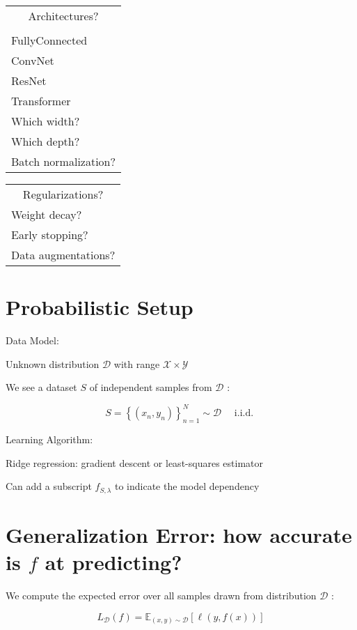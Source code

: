 \begin{center}
\begin{tabular}{|l|}
\hline
\multicolumn{1}{|c|}{Architectures?} \\
 \\
FullyConnected \\
ConvNet \\
ResNet \\
Transformer \\
Which width? \\
Which depth? \\
Batch normalization? \\
\hline
\end{tabular}
\end{center}

\begin{center}
\begin{tabular}{|l|}
\hline
\multicolumn{1}{|c|}{Regularizations?} \\
Weight decay? \\
Early stopping? \\
Data augmentations? \\
\hline
\end{tabular}
\end{center}

\section*{Probabilistic Setup}
Data Model:

Unknown distribution $\mathscr{D}$ with range $\mathscr{X} \times \mathscr{Y}$

We see a dataset $S$ of independent samples from $\mathscr{D}$ :

$$
S=\left\{\left(x_{n}, y_{n}\right)\right\}_{n=1}^{N} \sim \mathscr{D} \quad \text { i.i.d. }
$$

Learning Algorithm:

Ridge regression: gradient descent or least-squares estimator

Can add a subscript $f_{S, \lambda}$ to indicate the model dependency

\section*{Generalization Error: how accurate is $f$ at predicting?}
We compute the expected error over all samples drawn from distribution $\mathscr{D}$ :

$$
L_{\mathscr{D}}(f)=\mathbb{E}_{(x, y) \sim \mathscr{D}}[\ell(y, f(x))]
$$

